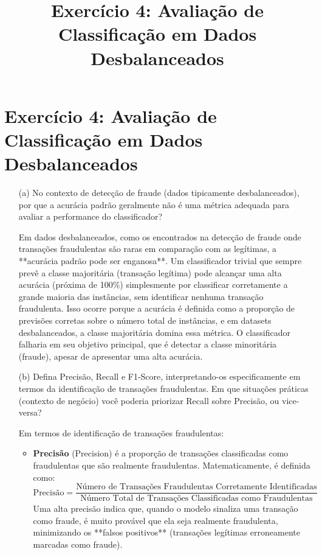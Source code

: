 \documentclass{article}
\title{Exercício 4: Avaliação de Classificação em Dados Desbalanceados}
\author{}
\date{}
\begin{document}
\maketitle

\section*{Exercício 4: Avaliação de Classificação em Dados Desbalanceados}

\begin{enumerate}
    \item[(a)] No contexto de detecção de fraude (dados tipicamente desbalanceados), por que a acurácia padrão geralmente não é uma métrica adequada para avaliar a performance do classificador?

    Em dados desbalanceados, como os encontrados na detecção de fraude onde transações fraudulentas são raras em comparação com as legítimas, a **acurácia padrão pode ser enganosa**. Um classificador trivial que sempre prevê a classe majoritária (transação legítima) pode alcançar uma alta acurácia (próxima de 100\%) simplesmente por classificar corretamente a grande maioria das instâncias, sem identificar nenhuma transação fraudulenta. Isso ocorre porque a acurácia é definida como a proporção de previsões corretas sobre o número total de instâncias, e em datasets desbalanceados, a classe majoritária domina essa métrica. O classificador falharia em seu objetivo principal, que é detectar a classe minoritária (fraude), apesar de apresentar uma alta acurácia.

    \item[(b)] Defina Precisão, Recall e F1-Score, interpretando-os especificamente em termos da identificação de transações fraudulentas. Em que situações práticas (contexto de negócio) você poderia priorizar Recall sobre Precisão, ou vice-versa?

    Em termos de identificação de transações fraudulentas:
    \begin{itemize}
        \item \textbf{Precisão} (Precision) é a proporção de transações classificadas como fraudulentas que são realmente fraudulentas. Matematicamente, é definida como:
        \[ \text{Precisão} = \frac{\text{Número de Transações Fraudulentas Corretamente Identificadas}}{\text{Número Total de Transações Classificadas como Fraudulentas}} \]
        Uma alta precisão indica que, quando o modelo sinaliza uma transação como fraude, é muito provável que ela seja realmente fraudulenta, minimizando os **falsos positivos** (transações legítimas erroneamente marcadas como fraude).


\end{itemize}
\end{enumerate}
\end{document}
